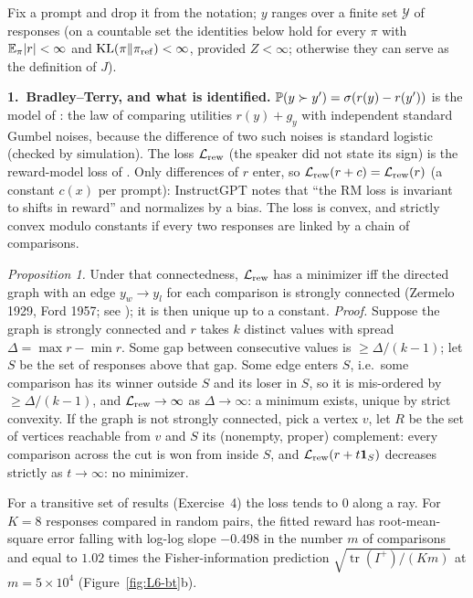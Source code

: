 \begin{beyond}\label{box:L6-bt}
Fix a prompt and drop it from the notation; $y$ ranges over a finite set $\mathcal Y$ of responses (on a countable set the identities below hold for every $\pi$ with $\mathbb{E}_\pi|r|<\infty$ and $\operatorname{KL}(\pi\|\pi_{\mathrm{ref}})<\infty$, provided $Z<\infty$; otherwise they can serve as the definition of $J$).

\textbf{1.\ Bradley--Terry, and what is identified.} $\mathbb{P}(y\succ y')=\sigma(r(y)-r(y'))$ is the model of \citet{bradley1952}: the law of comparing utilities $r(y)+g_y$ with independent standard Gumbel noises, because the difference of two such noises is standard logistic (checked by simulation). The loss $\mathcal{L}_{\mathrm{rew}}$ (the speaker did not state its sign) is the reward-model loss of \citet[eq.~(1)]{ouyang2022}. Only differences of $r$ enter, so $\mathcal{L}_{\mathrm{rew}}(r+c)=\mathcal{L}_{\mathrm{rew}}(r)$ (a constant $c(x)$ per prompt): InstructGPT notes that ``the RM loss is invariant to shifts in reward'' and normalizes by a bias. The loss is convex, and strictly convex modulo constants if every two responses are linked by a chain of comparisons.

\emph{Proposition 1.} Under that connectedness, $\mathcal{L}_{\mathrm{rew}}$ has a minimizer iff the directed graph with an edge $y_w\to y_l$ for each comparison is strongly connected (Zermelo 1929, Ford 1957; see \citealp{hunter2004}); it is then unique up to a constant. \emph{Proof.} Suppose the graph is strongly connected and $r$ takes $k$ distinct values with spread $\Delta=\max r-\min r$. Some gap between consecutive values is $\ge\Delta/(k-1)$; let $S$ be the set of responses above that gap. Some edge enters $S$, i.e.\ some comparison has its winner outside $S$ and its loser in $S$, so it is mis-ordered by $\ge\Delta/(k-1)$, and $\mathcal{L}_{\mathrm{rew}}\to\infty$ as $\Delta\to\infty$: a minimum exists, unique by strict convexity. If the graph is not strongly connected, pick a vertex $v$, let $R$ be the set of vertices reachable from $v$ and $S$ its (nonempty, proper) complement: every comparison across the cut is won from inside $S$, and $\mathcal{L}_{\mathrm{rew}}(r+t\mathbf 1_S)$ decreases strictly as $t\to\infty$: no minimizer.~\qedsymbol

For a transitive set of results (Exercise~4) the loss tends to $0$ along a ray. For $K=8$ responses compared in random pairs, the fitted reward has root-mean-square error falling with log-log slope $-0.498$ in the number $m$ of comparisons and equal to $1.02$ times the Fisher-information prediction $\sqrt{\operatorname{tr}(I^{+})/(Km)}$ at $m=5\times10^4$ (Figure~\ref{fig:L6-bt}b).


\end{beyond}
